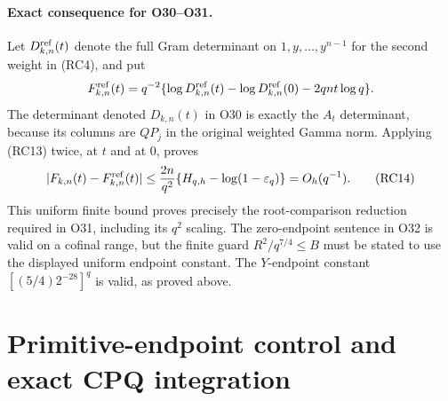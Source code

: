 \documentclass[11pt,a4paper]{article}
\begin{document}
\paragraph{Exact consequence for O30--O31.}
Let $D^{\rm ref}_{k,n}(t)$ denote the full Gram determinant on
$1,y,\ldots,y^{n-1}$ for the second weight in (RC4), and put
\[
 F^{\rm ref}_{k,n}(t)=q^{-2}
  \{\log D^{\rm ref}_{k,n}(t)-\log D^{\rm ref}_{k,n}(0)
                                   -2qnt\log q\}.
\]
The determinant denoted $D_{k,n}(t)$ in O30 is exactly the
$A_t$ determinant, because its columns are $QP_j$ in the original
weighted Gamma norm.
Applying (RC13) twice, at $t$ and at $0$, proves
\[
 |F_{k,n}(t)-F^{\rm ref}_{k,n}(t)|
 \leq\frac{2n}{q^2}
          \{H_{q,h}-\log(1-\varepsilon_q)\}
 =O_h(q^{-1}).                                  \tag{RC14}
\]
This uniform finite bound proves precisely the root-comparison
reduction required in O31, including its $q^2$ scaling.
The zero-endpoint sentence in O32 is valid on a cofinal range, but the
finite guard $R^2/q^{7/4}\leq B$ must be stated to use the displayed
uniform endpoint constant. The $Y$-endpoint constant
$[(5/4)2^{-28}]^q$ is valid, as proved above.



\endgroup

\clearpage
\begingroup
\def\im{\operatorname{im}}
\def\diag{\operatorname{diag}}
\def\Gr{\operatorname{Gram}}
\def\C{\mathbb C}

\setcounter{equation}{0}
\renewcommand{\theequation}{PEQ\arabic{equation}}
\section*{Primitive-endpoint control and exact CPQ integration}


\begin{abstract}
The original PRT comparison between primitive endpoints has three quotient directions. Its preceding finite estimate had logarithmic width $O(q\log a)$. The original full-remainder AKS estimate and the supplied LRC conductor bounds imply a native Loewner growth bound of width $O_{\rm actual}(q)$ before any fixed flag restriction or attained quotient. The three original PRT returns are therefore $O(q)$, as is the difference of the original common losses. In particular the primitive-endpoint difference has zero $q\log a$ coefficient, with an $O(q)$ remainder, on every retained rank stratum. This resolves that specific logarithmic ambiguity. It does not evaluate either absolute directional allocation, the independent proper-source standard return, or the retained-class projected signs; the requested directional completion target remains open.
\end{abstract}
\end{document}
